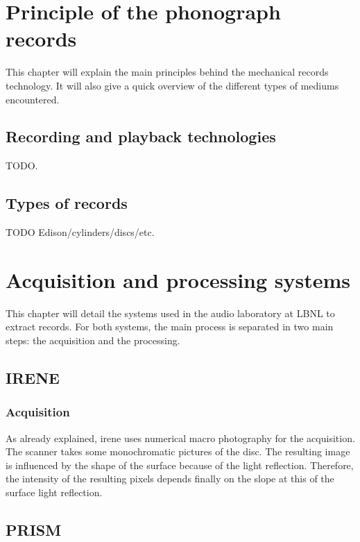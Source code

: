 
\chapter{Principle of the phonograph records}

This chapter will explain the main principles behind the mechanical records technology. It will also give a quick overview of the different types of mediums encountered.

\section{Recording and playback technologies}

TODO.

\section{Types of records}

TODO Edison/cylinders/discs/etc.

\chapter{Acquisition and processing systems}

This chapter will detail the systems used in the audio laboratory at LBNL to extract records. For both systems, the main process is separated in two main steps: the acquisition and the processing.

\section{IRENE}

\subsection{Acquisition}

As already explained, \gls{irene} uses numerical macro photography for the acquisition. The scanner takes some monochromatic pictures of the disc. The resulting image is influenced by the shape of the surface because of the light reflection. Therefore, the intensity of the resulting pixels depends finally on the slope at this of the surface light reflection.

\section{PRISM}

